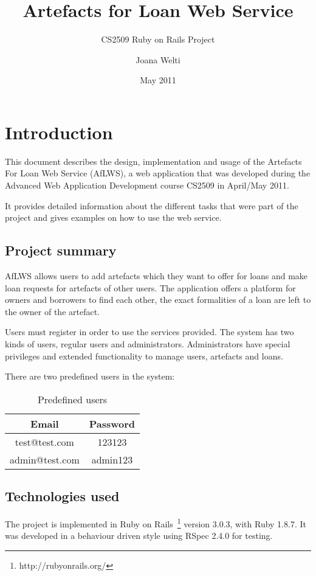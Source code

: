 \documentclass[fontsize=12pt,paper=a4]{scrartcl}
\begin{document}
\title{Artefacts for Loan Web Service}
\subtitle{CS2509 Ruby on Rails Project}
\date{May 2011}
\author{Joana Welti}
\maketitle

\tableofcontents


\section{Introduction}
This document describes the design, implementation and usage of the Artefacts For Loan Web Service (AfLWS), a web application that was developed during the Advanced Web Application Development course CS2509 in April/May 2011.

It provides detailed information about the different tasks that were part of the project and gives examples on how to use the web service.

\subsection{Project summary}
AfLWS allows users to add artefacts which they want to offer for loans and make loan requests for artefacts of other users. The application offers a platform for owners and borrowers to find each other, the exact formalities of a loan are left to the owner of the artefact.

Users must register in order to use the services provided. The system has two kinds of users, regular users and administrators. Administrators have special privileges and extended functionality to manage users, artefacts and loans. 

There are two predefined users in the system:
\begin{table}[htdp]
\caption{Predefined users}
\begin{center}
\begin{tabular}{|c|c|}
\hline
\bf{Email} & \bf{Password} \\
\hline
test@test.com & 123123 \\
admin@test.com & admin123 \\
\hline
\end{tabular}
\end{center}
\label{default}
\end{table}%


\subsection{Technologies used}
The project is implemented in Ruby on Rails~\footnote{http://rubyonrails.org/} version 3.0.3, with Ruby 1.8.7. It was developed in a behaviour driven style using RSpec 2.4.0 for testing.
\end{document}
